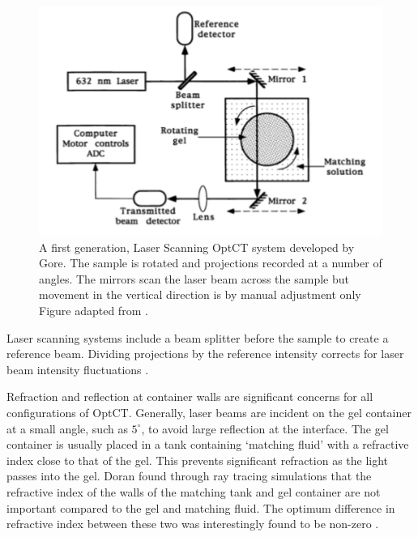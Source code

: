 \documentclass[12pt]{article}
\begin{document}
 


\begin{figure}[H]
\centering
\includegraphics[scale=0.6]{Gore_setup.pdf}
\caption{A first generation,  Laser Scanning OptCT system developed by Gore. The sample is rotated and projections recorded at a number of angles. The  mirrors scan the laser beam across the sample but movement in the vertical direction is by manual adjustment only Figure adapted from \cite{Gore:1999tg}. }
\label{fig:gore_setup}
\end{figure}


Laser scanning systems include a  beam splitter before the sample to create a reference beam. Dividing projections by the reference intensity  corrects for laser beam intensity fluctuations \cite{Gore:1999tg}.

Refraction and reflection at container walls are significant concerns for all configurations of  OptCT. Generally, laser beams are incident on the gel container at a small angle, such as $5^{\circ}$, to avoid large reflection at the interface. The gel container is usually placed in a tank containing `matching fluid' with a refractive index close to that of the gel. This prevents significant refraction as the light passes into the gel. Doran found through ray tracing simulations that the refractive index of the walls of the matching tank and  gel container are not important compared to the gel and matching fluid. The optimum difference in refractive index between these two was interestingly found to be non-zero \cite{Doran:2001ee}. 
\end{document}
